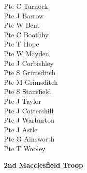 \begin{multicols}{3}
  Pte C Turnock \\
  Pte J Barrow \\
  Pte W Bent \\
  Pte C Boothby \\
  Pte T Hope \\
  Pte W Mayden \\
  Pte J Corbishley \\
  Pte S Grimsditch \\
  Pte M Grimsditch \\
  Pte S Stansfield \\
  Pte J Taylor \\
  Pte J Cottershill \\
  Pte J Warburton \\
  Pte J Astle \\
  Pte G Ainsworth \\
  Pte T Wooley \\
\end{multicols}

\vspace*{10mm}

\begin{center}
  \Large
  \textbf{2nd Macclesfield Troop}
\end{center}

